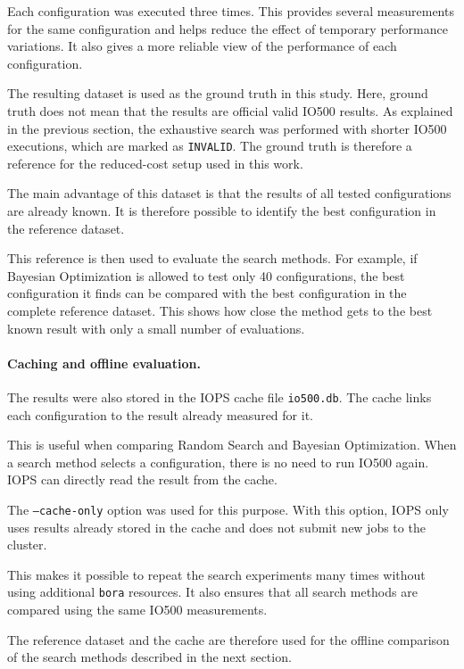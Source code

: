 Each configuration was executed three times. This provides several
measurements for the same configuration and helps reduce the effect of
temporary performance variations. It also gives a more reliable view of
the performance of each configuration.

The resulting dataset is used as the ground truth in this study. Here,
ground truth does not mean that the results are official valid IO500
results. As explained in the previous section, the exhaustive search was
performed with shorter IO500 executions, which are marked as
\texttt{INVALID}. The ground truth is therefore a reference for the
reduced-cost setup used in this work.

The main advantage of this dataset is that the results of all tested
configurations are already known. It is therefore possible to identify
the best configuration in the reference dataset.

This reference is then used to evaluate the search methods. For example,
if Bayesian Optimization is allowed to test only 40 configurations, the
best configuration it finds can be compared with the best configuration
in the complete reference dataset. This shows how close the method gets
to the best known result with only a small number of evaluations.

\paragraph{Caching and offline evaluation.}

The results were also stored in the IOPS cache file
\texttt{io500.db}. The cache links each configuration to the result
already measured for it.

This is useful when comparing Random Search and Bayesian Optimization.
When a search method selects a configuration, there is no need to run
IO500 again. IOPS can directly read the result from the cache.

The \texttt{--cache-only} option was used for this purpose. With this
option, IOPS only uses results already stored in the cache and does not
submit new jobs to the cluster.

This makes it possible to repeat the search experiments many times
without using additional \texttt{bora} resources. It also ensures that
all search methods are compared using the same IO500 measurements.

The reference dataset and the cache are therefore used for the offline
comparison of the search methods described in the next section.


